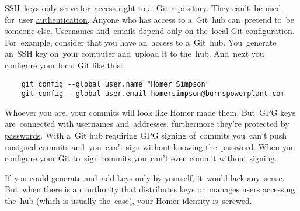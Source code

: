 \label{gitgpg}
SSH~keys only serve for~access right to a~\hyperref[git]{Git} repository.
They can't~be used for~user \hyperref[authenticationauthorization]{authentication}.
Anyone who has access to a~Git~hub can~pretend to~be someone else.
Usernames and~emails depend only on the~local Git configuration.
For~example, consider that you have an~access to a~Git~hub.
You~generate an~SSH key on~your computer and~upload it to the~hub.
And~next you configure your local Git like this:
\begin{lstlisting}
    git config --global user.name "Homer Simpson"
    git config --global user.email homersimpson@burnspowerplant.com
\end{lstlisting}
\noindent Whoever you are, your commits will look like Homer made them.
But~GPG keys are~connected with usernames and~addresses, furthermore they're protected by \hyperref[keypassword]{passwords}.
With a~Git hub requiring GPG signing of~commits you~can't push unsigned commits and~you~can't sign without knowing the~password.
When you configure your Git to~sign commits you~can't even commit without signing.

If~you could generate and~add keys only by yourself, it~would lack any~sense.
But~when there is an~authority that distributes keys or~manages users accessing the~hub (which is usually the~case), your Homer identity is~screwed.
